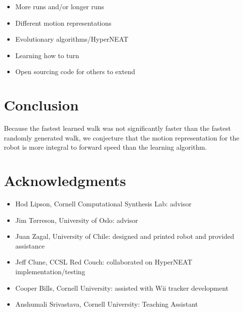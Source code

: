 
\begin{itemize}
\item More runs and/or longer runs
\item Different motion representations
\item Evolutionary algorithms/HyperNEAT\cite{2}
\item Learning how to turn
\item Open sourcing code for others to extend
\end{itemize}



\section{Conclusion}


Because the fastest learned walk was not
significantly faster than the fastest randomly generated walk, we
conjecture that the motion representation for the robot is more
integral to forward speed than the learning algorithm.



\section{Acknowledgments}
\begin{itemize}
\item Hod Lipson, Cornell Computational Synthesis Lab: advisor
\item Jim T\o rreson, University of Oslo: advisor
\item Juan Zagal, University of Chile: designed and printed robot and provided assistance
\item Jeff Clune, CCSL Red Couch: collaborated on HyperNEAT implementation/testing
\item Cooper Bills, Cornell University: assisted with Wii tracker development
\item Anshumali Srivastava, Cornell University: Teaching Assistant
\end{itemize}


